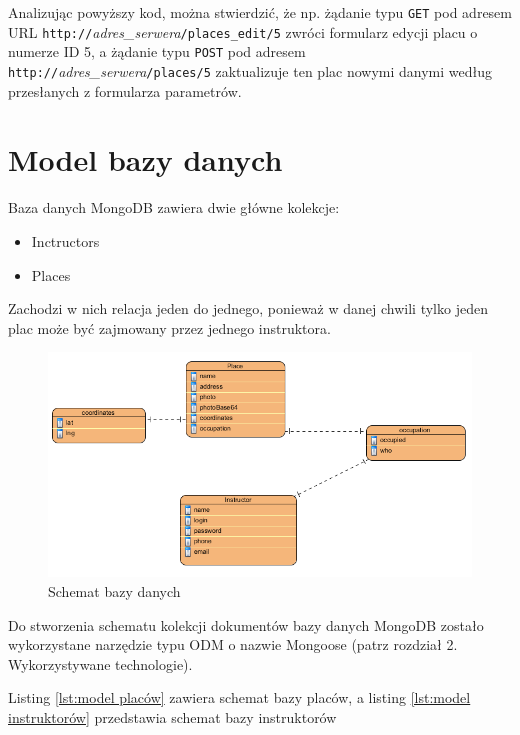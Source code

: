 \documentclass[twoside,a4paper,openright,12pt]{book}
\begin{document}
Analizując powyższy kod, można stwierdzić, że np. żądanie typu \texttt{GET} pod adresem URL \texttt{http://}\textit{adres\_serwera}\texttt{/places\_edit/5} zwróci formularz edycji placu o numerze ID 5, a żądanie typu \texttt{POST} pod adresem \texttt{http://}\textit{adres\_serwera}\texttt{/places/5} zaktualizuje ten plac nowymi danymi według przesłanych z formularza parametrów.


\section{Model bazy danych}

Baza danych MongoDB zawiera dwie główne kolekcje:
\begin{itemize}
\item{Inctructors}
\item{Places}
\end{itemize}

Zachodzi w nich relacja jeden do jednego, ponieważ w danej chwili tylko jeden plac może być zajmowany przez jednego instruktora.

\begin{figure}[htbp]
\centering
\includegraphics[width=1\textwidth]{screenshots/uml/db_schema.png}
\caption{Schemat bazy danych}
\end{figure}

Do stworzenia schematu kolekcji dokumentów bazy danych MongoDB zostało wykorzystane narzędzie typu ODM o nazwie Mongoose (patrz rozdział 2. Wykorzystywane technologie).

Listing \ref{lst:model placów} zawiera schemat bazy placów, a listing \ref{lst:model instruktorów} przedstawia schemat bazy instruktorów
\end{document}
